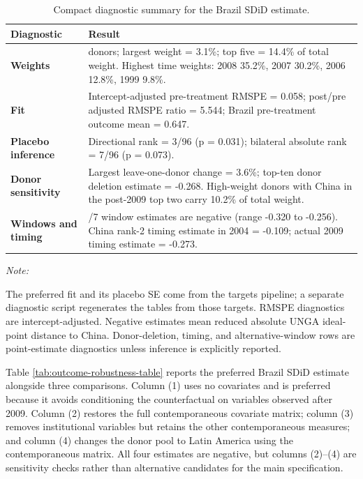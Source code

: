 \documentclass[
  12pt,
]{article}
\begin{document}
\begin{table}[H]
\centering
\caption{\label{tab:brazil-sdid-diagnostic-summary}Compact diagnostic summary for the Brazil SDiD estimate.}
\centering
\fontsize{9}{11}\selectfont
\begin{threeparttable}
\begin{tabular}[t]{>{\raggedright\arraybackslash}p{3.3cm}>{\raggedright\arraybackslash}p{11.0cm}}
\toprule
\textbf{Diagnostic} & \textbf{Result}\\
\midrule
\textbf{Weights} & 95 donors; largest weight = 3.1\%; top five = 14.4\% of total weight. Highest time weights: 2008 35.2\%, 2007 30.2\%, 2006 12.8\%, 1999 9.8\%.\\
\cmidrule{1-2}
\textbf{Fit} & Intercept-adjusted pre-treatment RMSPE = 0.058; post/pre adjusted RMSPE ratio = 5.544; Brazil pre-treatment outcome mean = 0.647.\\
\cmidrule{1-2}
\textbf{Placebo inference} & Directional rank = 3/96 (p = 0.031); bilateral absolute rank = 7/96 (p = 0.073).\\
\cmidrule{1-2}
\textbf{Donor sensitivity} & Largest leave-one-donor change = 3.6\%; top-ten donor deletion estimate = -0.268. High-weight donors with China in the post-2009 top two carry 10.2\% of total weight.\\
\cmidrule{1-2}
\textbf{Windows and timing} & 7/7 window estimates are negative (range -0.320 to -0.256). China rank-2 timing estimate in 2004 = -0.109; actual 2009 timing estimate = -0.273.\\
\bottomrule
\end{tabular}
\begin{tablenotes}
\item \textit{Note: } 
\item The preferred fit and its placebo SE come from the targets pipeline; a separate diagnostic script regenerates the tables from those targets. RMSPE diagnostics are intercept-adjusted. Negative estimates mean reduced absolute UNGA ideal-point distance to China. Donor-deletion, timing, and alternative-window rows are point-estimate diagnostics unless inference is explicitly reported.
\end{tablenotes}
\end{threeparttable}
\end{table}

Table \ref{tab:outcome-robustness-table} reports the preferred Brazil SDiD estimate alongside three comparisons. Column (1) uses no covariates and is preferred because it avoids conditioning the counterfactual on variables observed after 2009. Column (2) restores the full contemporaneous covariate matrix; column (3) removes institutional variables but retains the other contemporaneous measures; and column (4) changes the donor pool to Latin America using the contemporaneous matrix. All four estimates are negative, but columns (2)--(4) are sensitivity checks rather than alternative candidates for the main specification.
\end{document}
